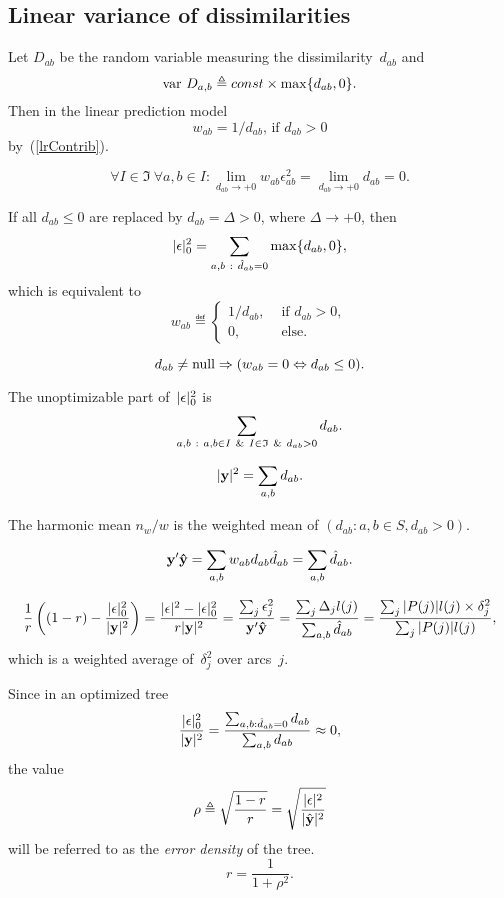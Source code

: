 \documentclass[10pt,a4paper]{article}
\theoremstyle{plain} \newtheorem{Lem}{Lemma}
\begin{document}
\subsection{Linear variance of dissimilarities}

Let $D_{ab}$ be the random variable measuring the dissimilarity~$d_{ab}$ and
\begin{equation} \label{distVar}
\mathrm {var} \  D_{a,b} \triangleq const \times \max \{d_{ab}, 0 \}.
\end{equation}
Then in the linear prediction model
$$w_{ab} = 1/d_{ab} \text {, if } d_{ab} > 0$$
by~(\ref{lrContrib}).

$$ \forall I \in \mathfrak I \ \forall a,b \in I: \lim_{d_{ab} \to +0} w_{ab} \epsilon^2_{ab} = \lim_{d_{ab} \to +0} d_{ab} = 0. $$

If all $d_{ab} \le 0$ are replaced by $d_{ab} = \Delta > 0$, where $\Delta \to +0$,
then
$$ |\ve \epsilon|^2_0 = \sum_{a,b \ : \ \hat d_{ab}=0} \max\{d_{ab}, 0\}, $$
which is equivalent to
\begin{equation} \label{distWeight}
w_{ab} \eqdef
\begin{cases}
1/d_{ab}, &\text{ if } d_{ab} > 0, \\
0, &\text{ else}.
\end{cases}
\end{equation}

\begin{equation} \label{zeroWeight}
d_{ab} \ne \mathrm {null} \Rightarrow (w_{ab} = 0 \Leftrightarrow d_{ab} \le 0).
\end{equation}

The unoptimizable part of~$|\mathbf \epsilon|^2_0$ is
$$ \sum_{a,b \ : \ a,b \in I \And I \in \mathfrak I \And d_{ab} > 0} d_{ab}. $$

$$ |\mathbf y|^2 = \sum_{a,b} d_{ab}. $$

The harmonic mean $n_w/w$ is the weighted mean of $(d_{ab} : a,b \in S, d_{ab} > 0)$.

$$ \mathbf y' \mathbf {\hat y} = \sum_{a,b} w_{ab} d_{ab} \hat d_{ab} = \sum_{a,b} \hat d_{ab}. $$

$$ \frac 1 r \left( (1-r) - \frac {|\mathbf \epsilon|^2_0} {|\mathbf y|^2} \right)
= \frac {|\mathbf \epsilon|^2 - |\mathbf \epsilon|^2_0} {r |\mathbf y|^2}
= \frac {\sum_j \epsilon^2_j} {\mathbf y' \mathbf {\hat y}}
= \frac {\sum_j \Delta_j l(j)} {\sum_{a,b} \hat d_{ab}}
= \frac {\sum_j |P(j)| l(j) \times \delta^2_j} {\sum_j |P(j)| l(j)},
$$
which is a weighted average of~$\delta^2_j$ over arcs~$j$.

Since in an optimized tree
$$ \frac {|\mathbf \epsilon|^2_0} {|\mathbf y|^2} = \frac {\sum_{a,b:\hat d_{ab}=0} d_{ab}} {\sum_{a,b} d_{ab}} \approx 0, $$
the value
$$ \rho \triangleq \sqrt{\frac {1-r} r} = \sqrt {\frac {|\mathbf \epsilon|^2} {|\hat {\mathbf y}|^2}} $$
will be referred to as the {\em error density} of the tree.
$$ r = \frac 1 {1 + \rho^2}. $$
\end{document}
